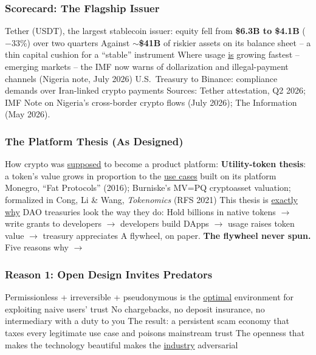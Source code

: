 \documentclass[aspectratio=169]{beamer}
\begin{document}
\begin{frame}
\frametitle{Scorecard: The Flagship Issuer}

\bi
\m Tether (USDT), the largest stablecoin issuer: equity fell from \textbf{\$6.3B to \$4.1B} ($-$33\%) over two quarters \pause
\m Against $\sim$\textbf{\$41B} of riskier assets on its balance sheet -- a thin capital cushion for a ``stable'' instrument \pause
\m Where usage \ul{is} growing fastest -- emerging markets -- the IMF now warns of dollarization and illegal-payment channels (Nigeria note, July 2026) \pause
\m U.S.\ Treasury to Binance: compliance demands over Iran-linked crypto payments
\ei
\vfill
{\scriptsize Sources: Tether attestation, Q2 2026; IMF Note on Nigeria's cross-border crypto flows (July 2026); The Information (May 2026).}

\end{frame}

\begin{frame}
\frametitle{The Platform Thesis (As Designed)}

How crypto was \ul{supposed} to become a product platform:
\bi
\m \textbf{Utility-token thesis}: a token's value grows in proportion to the \ul{use cases} built on its platform
\bi
\m Monegro, ``Fat Protocols'' (2016); Burniske's MV=PQ cryptoasset valuation; formalized in Cong, Li \& Wang, \emph{Tokenomics} (RFS 2021)
\ei \pause
\m This thesis is \ul{exactly why} DAO treasuries look the way they do:
\bi
\m Hold billions in native tokens $\rightarrow$ write grants to developers $\rightarrow$ developers build DApps $\rightarrow$ usage raises token value $\rightarrow$ treasury appreciates
\ei \pause
\m A flywheel, on paper. \pause \textbf{The flywheel never spun.} Five reasons why $\rightarrow$
\ei

\end{frame}

\begin{frame}
\frametitle{Reason 1: Open Design Invites Predators}

\bi
\m Permissionless + irreversible + pseudonymous is the \ul{optimal} environment for exploiting naive users' trust \pause
\m No chargebacks, no deposit insurance, no intermediary with a duty to you \pause
\m The result: a persistent scam economy that taxes every legitimate use case and poisons mainstream trust \pause
\m The openness that makes the technology beautiful makes the \ul{industry} adversarial
\ei

\end{frame}
\end{document}
